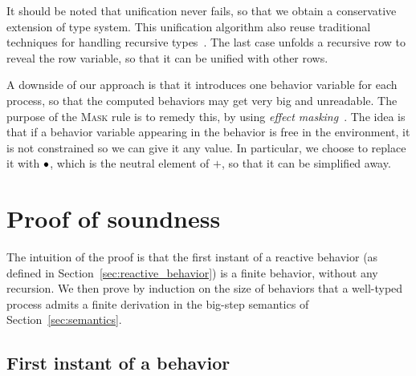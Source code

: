 \documentclass[9pt,preprint]{sigplanconf}
\begin{document}
\noindent It should be noted that unification never fails, so that we obtain a conservative extension of \rml type system. This unification algorithm also reuse traditional techniques for handling recursive types~\cite{Huet:1975}. The last case unfolds a recursive row to reveal the row variable, so that it can be unified with other rows. 

A downside of our approach is that it introduces one behavior variable for each process, so that the computed behaviors may get very big and unreadable. The purpose of the \textsc{Mask} rule is to remedy this, by using \emph{effect masking}~\cite{Lucassen:1988}. The idea is that if a behavior variable appearing in the behavior is free in the environment, it is not constrained so we can give it any value. In particular, we choose to replace it with $\bullet$, which is the neutral element of $+$, so that it can be simplified away.


\section{Proof of soundness}
\label{sec:soundness}

The intuition of the proof is that the first instant of a reactive behavior (as defined in Section~\ref{sec:reactive_behavior}) is a finite behavior, without any recursion. We then prove by induction on the size of behaviors that a well-typed process admits a finite derivation in the big-step semantics of Section~\ref{sec:semantics}.

\subsection{First instant of a behavior}
\end{document}
